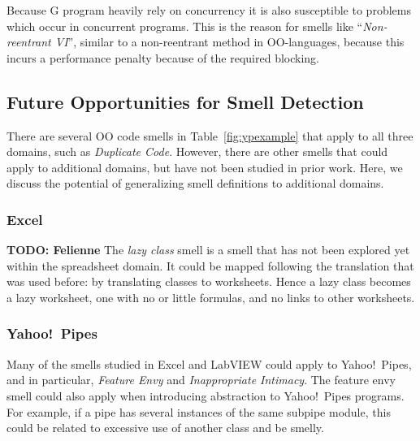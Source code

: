 \documentclass[10pt,conference,compsocconf]{IEEEtran}
\newcommand{\todo}[1]{\textbf{TODO: #1}}
\begin{document}
Because G program heavily rely on concurrency it is also susceptible to problems which occur in concurrent programs.
This is the reason for smells like ``\textit{Non-reentrant VI}'', similar to a non-reentrant method in OO-languages, because this incurs a performance penalty because of the required blocking.

\subsection{Future Opportunities for Smell Detection}
\label{subsec:futuresmells}
There are several OO code smells in Table~\ref{fig:ypexample} that apply to all three domains, such as \emph{Duplicate Code}. However, there are other smells that could apply to additional domains, but have not been studied in prior work. Here, we discuss the potential of generalizing smell definitions to additional domains. 

\subsubsection{Excel} \todo{Felienne}
The \emph{lazy class} smell is a smell that has not been explored yet within the spreadsheet domain. It could be mapped following the translation that was used before: by translating classes to worksheets. Hence a lazy class becomes a lazy worksheet, one with no or little formulas, and no links to other worksheets.


\subsubsection{Yahoo!\ Pipes}
\label{sec:smells:future:yp}
Many of the smells studied in Excel and LabVIEW could apply to Yahoo!\ Pipes, and in particular, \emph{Feature Envy} and \emph{Inappropriate Intimacy}. 
The feature envy smell could also apply when introducing abstraction to Yahoo!\ Pipes programs. For example, if a pipe has several instances of the same subpipe module, this could be related to excessive use of another class and be smelly. 
\end{document}
